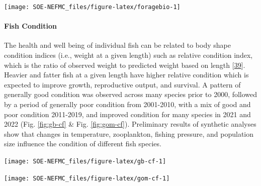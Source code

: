 \documentclass[
  10pt,
]{article}
\let\origfigure\figure
\let\endorigfigure\endfigure
\renewenvironment{figure}[1][2] {
    \expandafter\origfigure\expandafter[H]
} {
    \endorigfigure
}
\begin{document}
\begin{figure}

{\centering \texttt{[image: SOE-NEFMC\_files/figure-latex/foragebio-1]} 

}

\caption{Forage fish index based on spring and fall survey predator diets.}\label{fig:foragebio}
\end{figure}

\hypertarget{fish-condition}{%
\paragraph{Fish Condition}\label{fish-condition}}

The health and well being of individual fish can be related to body shape condition indices (i.e., weight at a given length) such as relative condition index, which is the ratio of observed weight to predicted weight based on length {[}\protect\hyperlink{ref-le_cren_length-weight_1951}{39}{]}. Heavier and fatter fish at a given length have higher relative condition which is expected to improve growth, reproductive output, and survival. A pattern of generally good condition was observed across many species prior to 2000, followed by a period of generally poor condition from 2001-2010, with a mix of good and poor condition 2011-2019, and improved condition for many species in 2021 and 2022 (Fig. \ref{fig:gb-cf} \& Fig. \ref{fig:gom-cf}). Preliminary results of synthetic analyses show that changes in temperature, zooplankton, fishing pressure, and population size influence the condition of different fish species.

\begin{figure}

{\centering \texttt{[image: SOE-NEFMC\_files/figure-latex/gb-cf-1]} 

}

\caption{Condition factor for fish species on Georges Bank based on fall NEFSC bottom trawl survey data. No survey was conducted in 2020.}\label{fig:gb-cf}
\end{figure}

\begin{figure}

{\centering \texttt{[image: SOE-NEFMC\_files/figure-latex/gom-cf-1]} 

}

\caption{Condition factor for fish species in the Gulf of Maine based on fall NEFSC bottom trawl survey data. No survey was conducted in 2020.}\label{fig:gom-cf}
\end{figure}
\end{document}
